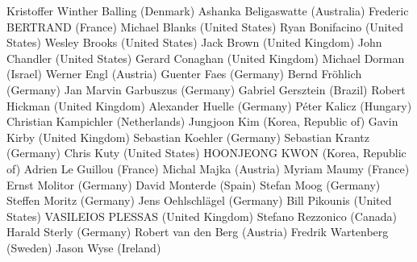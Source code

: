Kristoffer Winther Balling (Denmark)
Ashanka Beligaswatte (Australia)
Frederic BERTRAND (France)
Michael Blanks (United States)
Ryan Bonifacino (United States)
Wesley Brooks (United States)
Jack Brown (United Kingdom)
John Chandler (United States)
Gerard Conaghan (United Kingdom)
Michael Dorman (Israel)
Werner Engl (Austria)
Guenter Faes (Germany)
Bernd Fröhlich (Germany)
Jan Marvin Garbuszus (Germany)
Gabriel Gersztein (Brazil)
Robert Hickman (United Kingdom)
Alexander Huelle (Germany)
Péter Kalicz (Hungary)
Christian Kampichler (Netherlands)
Jungjoon Kim (Korea, Republic of)
Gavin Kirby (United Kingdom)
Sebastian Koehler (Germany)
Sebastian Krantz (Germany)
Chris Kuty (United States)
HOONJEONG KWON (Korea, Republic of)
Adrien Le Guillou (France)
Michal Majka (Austria)
Myriam Maumy (France)
Ernst Molitor (Germany)
David Monterde (Spain)
Stefan Moog (Germany)
Steffen Moritz (Germany)
Jens Oehlschlägel (Germany)
Bill Pikounis (United States)
VASILEIOS PLESSAS (United Kingdom)
Stefano Rezzonico (Canada)
Harald Sterly (Germany)
Robert van den Berg (Austria)
Fredrik Wartenberg (Sweden)
Jason Wyse (Ireland)


\address{Torsten Hothorn \\
  Universit\"at Z\"urich, Switzerland}
